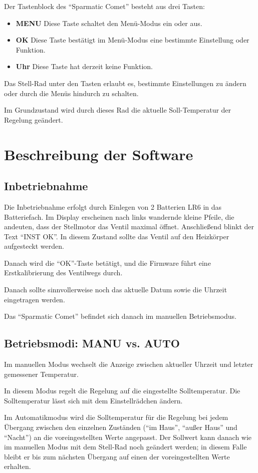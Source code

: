 \documentclass[a4paper]{article}
\newcommand\SC{"`Sparmatic Comet"' }
\begin{document}
Der Tastenblock des \SC besteht aus drei Tasten:

\begin{itemize}
\item \textbf{MENU} Diese Taste schaltet den Menü-Modus ein oder aus.
\item \textbf{OK} Diese Taste bestätigt im Menü-Modus eine bestimmte
  Einstellung oder Funktion.
\item \textbf{Uhr} Diese Taste hat derzeit keine Funktion.
\end{itemize}

Das Stell-Rad unter den Tasten erlaubt es, bestimmte Einstellungen zu
ändern oder durch die Menüs hindurch zu schalten.

Im Grundzustand wird durch dieses Rad die aktuelle Soll-Temperatur
der Regelung geändert.

\section {
  Beschreibung der Software
}

\subsection {
  Inbetriebnahme
}

Die Inbetriebnahme erfolgt durch Einlegen von 2 Batterien LR6 in das
Batteriefach.  Im Display erscheinen nach links wandernde kleine
Pfeile, die andeuten, dass der Stellmotor das Ventil maximal öffnet.
Anschließend blinkt der Text "`INST OK"'.  In diesem Zustand sollte
das Ventil auf den Heizkörper aufgesteckt werden.

Danach wird die "`OK"'-Taste betätigt, und die Firmware führt eine
Erstkalibrierung des Ventilwegs durch.

Danach sollte sinnvollerweise noch das aktuelle Datum sowie die
Uhrzeit eingetragen werden.

Das \SC befindet sich danach im manuellen Betriebsmodus.

\subsection {
  Betriebsmodi: MANU vs. AUTO
}

Im manuellen Modus wechselt
die Anzeige zwischen aktueller Uhrzeit und letzter gemessener
Temperatur.

In diesem Modus regelt die Regelung auf die eingestellte Solltemperatur.
Die Solltemperatur lässt sich mit dem Einstellrädchen ändern.

Im Automatikmodus wird die Solltemperatur für die Regelung bei jedem
Übergang zwischen den einzelnen Zuständen ("`im Haus"', "`außer Haus"'
und "`Nacht"') an die voreingestellten Werte angepasst.  Der Sollwert
kann danach wie im manuellen Modus mit dem Stell-Rad noch geändert
werden; in diesem Falle bleibt er bis zum nächsten Übergang auf einen
der voreingestellten Werte erhalten.
\end{document}
